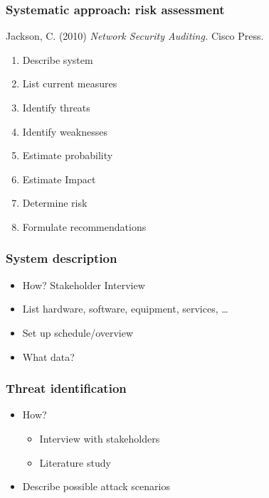 \documentclass[aspectratio=169]{beamer}
\begin{document}
\begin{frame}
  \frametitle{Systematic approach: risk assessment}

  Jackson, C. (2010) \textit{Network Security Auditing.} Cisco Press.

  \begin{enumerate}
    \item Describe system
    \item List current measures
    \item Identify threats
    \item Identify weaknesses
    \item Estimate probability
    \item Estimate Impact
    \item Determine risk
    \item Formulate recommendations
  \end{enumerate}

\end{frame}

\begin{frame}
  \frametitle{System description}

  \begin{itemize}
    \item How? Stakeholder Interview
    \item List hardware, software, equipment, services, \ldots
    \item Set up schedule/overview
    \item What data?
  \end{itemize}

\end{frame}

\begin{frame}
  \frametitle{Threat identification}

  \begin{itemize}
    \item How?
          \begin{itemize}
            \item Interview with stakeholders
            \item Literature study
          \end{itemize}
    \item Describe possible attack scenarios
  \end{itemize}

\end{frame}
\end{document}
